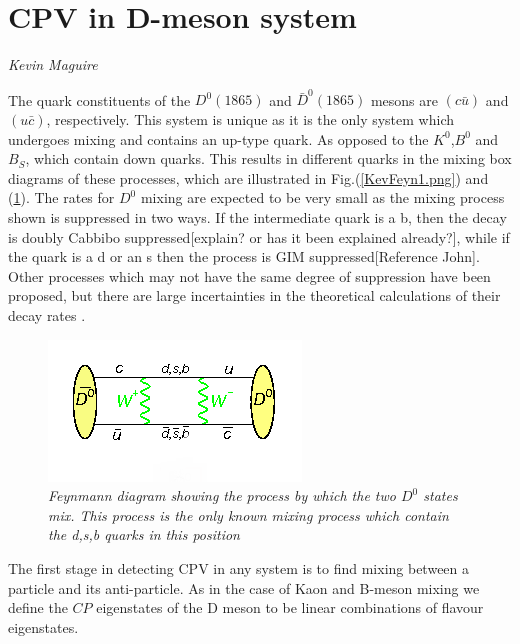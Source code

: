 \section{CPV in D-meson system}
\vspace{-1.0em}
\begin{center}
\tiny{\textit{Kevin Maguire}}
\end{center}

The quark constituents of the $D^{0}(1865)$ and $\bar{D}^{0}(1865)$ mesons are $(c \bar{u})$ and $(u \bar{c})$, respectively. This system is unique as it is the only system which undergoes mixing and contains an up-type quark. As opposed to the $K^{0}$,$B^{0}$ and $B_{S}$, which contain down quarks. This results in different quarks in the mixing box diagrams of these processes, which are illustrated in Fig.(\ref{KevFeyn1.png}) and (\ref{Deon_Mixing_Feyn}). The rates for $D^0$ mixing are expected to be very small as the mixing process shown is suppressed in two ways. If the intermediate quark is a b, then the decay is doubly Cabbibo suppressed[explain? or has it been explained already?], while if the quark is a d or an s then the process is GIM suppressed[Reference John]. Other processes which may not have the same degree of suppression have been proposed, but there are large incertainties in the theoretical calculations of their decay rates \cite{Babar_D0_Review}.    

\begin{figure}[h!]
\begin{center}
\includegraphics[scale=0.8]{figs/Deon_mixing_feyn.png}
\end{center}
\caption{\textit{Feynmann diagram showing the process by which the two $D^{0}$ states mix. This process is the only known mixing process which contain the d,s,b quarks in this position \cite{Deon_Mixing_Feyn}}}
\label{Deon_Mixing_Feyn}
\end{figure}

The first stage in detecting CPV in any system is to find mixing between a particle and its anti-particle. As in the case of Kaon and B-meson mixing we define the $CP$ eigenstates of the D meson to be linear combinations of flavour eigenstates.

